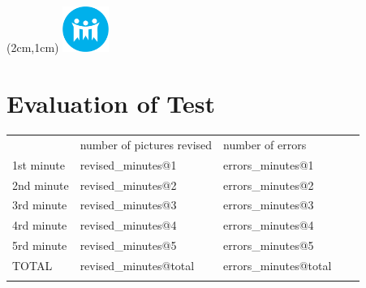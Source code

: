 \documentclass[12pt,a4paper]{article}
\begin{document}
\textblockorigin{-18pt}{-2pt}
\begin{textblock*}{10cm}(2cm,1cm)
\includegraphics[width=1.5cm]{logo.png}
\end{textblock*}



\section*{Evaluation of Test}      

\begin{table}[]
\begin{tabular}{lllll}
\cline{1-3}
\multicolumn{1}{|l|}{} & \multicolumn{1}{l|}{number of pictures revised} & \multicolumn{1}{l|}{number of errors} &  &  \\ \cline{1-3}
\multicolumn{1}{|l|}{1st minute} & \multicolumn{1}{l|}{revised_minutes@1} & \multicolumn{1}{l|}{errors_minutes@1} &  &  \\ \cline{1-3}
\multicolumn{1}{|l|}{2nd minute} & \multicolumn{1}{l|}{revised_minutes@2} & \multicolumn{1}{l|}{errors_minutes@2} &  &  \\ \cline{1-3}
\multicolumn{1}{|l|}{3rd minute} & \multicolumn{1}{l|}{revised_minutes@3} & \multicolumn{1}{l|}{errors_minutes@3} &  &  \\ \cline{1-3}
\multicolumn{1}{|l|}{4rd minute} & \multicolumn{1}{l|}{revised_minutes@4} & \multicolumn{1}{l|}{errors_minutes@4} &  &  \\ \cline{1-3}
\multicolumn{1}{|l|}{5rd minute} & \multicolumn{1}{l|}{revised_minutes@5} & \multicolumn{1}{l|}{errors_minutes@5} &  &  \\ \cline{1-3}
\multicolumn{1}{|l|}{TOTAL} & \multicolumn{1}{l|}{revised_minutes@total} & \multicolumn{1}{l|}{errors_minutes@total} &  &  \\ \cline{1-3}
                       &                       &                       &  & 
\end{tabular}
\end{table}
\end{document}
